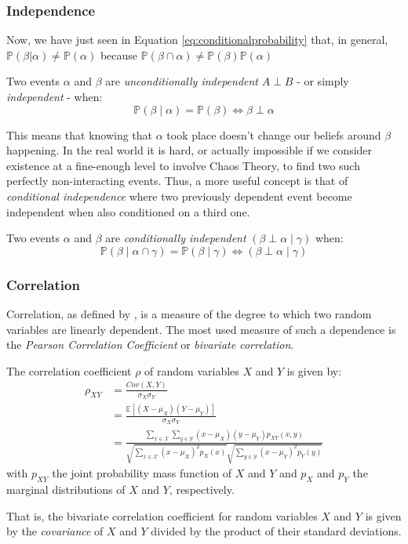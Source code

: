 \subsubsection{Independence}
Now, we have just seen in Equation \ref{eq:conditionalprobability} that, in general, $\mathbb{P}(\beta | \alpha) \neq \mathbb{P}(\alpha)$ because $\mathbb{P}(\beta \cap \alpha) \neq \mathbb{P}(\beta) \mathbb{P}(\alpha)$
\begin{definition}
Two events $\alpha$ and $\beta$ are \textit{unconditionally independent} $A \perp B$ - or simply \textit{independent} - when:
\begin{equation}
	\mathbb{P}(\beta \mid \alpha) = \mathbb{P}(\beta) \Leftrightarrow \beta \perp \alpha
\end{equation}
\end{definition}
This means that knowing that $\alpha$ took place doesn't change our beliefs around $\beta$ happening. 
In the real world it is hard, or actually impossible if we consider existence at a fine-enough level to involve Chaos Theory, to find two such perfectly non-interacting events.
Thus, a more useful concept is that of \textit{conditional independence} where two previously dependent event become independent when also conditioned on a third one.
\begin{definition}
Two events $\alpha$ and $\beta$ are \textit{conditionally independent} $(\beta \perp \alpha \mid \gamma)$ when:
	\begin{equation}
	\mathbb{P}(\beta \mid \alpha \cap \gamma ) = \mathbb{P}(\beta \mid \gamma) \Leftrightarrow (\beta \perp \alpha \mid \gamma)
\end{equation}
\end{definition}

\subsubsection{Correlation}
Correlation, as defined by \cite{Stolp2006}, is a measure of the degree to which two random variables are linearly dependent.
The most used measure of such a dependence is the \textit{Pearson Correlation Coefficient} or \textit{bivariate correlation}.
\begin{definition}
	The correlation coefficient $\rho$ of random variables $X$ and $Y$ is given by:
	\begin{align} \label{eq:correlation}
		\rho_{XY} &= \frac{Cov(X,Y)}{\sigma_X \sigma_Y} \\
		&= \frac{\mathbb{E}[ (X - \mu_X) (Y - \mu_Y) ]}{\sigma_X \sigma_Y} \\
		&= \frac{\sum_{x \in \mathcal{X}} \sum_{y \in \mathcal{Y}} (x - \mu_X) (y - \mu_Y) p_{XY}(x,y)}{ \sqrt{\sum_{x \in \mathcal{X}}  (x - \mu_X)^2 p_X(x)} \sqrt{\sum_{y \in \mathcal{Y}} (x - \mu_Y)^2 p_Y(y)} } 
	\end{align}
	with $p_{XY}$ the joint probability mass function of $X$ and $Y$ and $p_{X}$ and $p_{Y}$ the marginal distributions of $X$ and $Y$, respectively.
\end{definition}
That is, the bivariate correlation coefficient for random variables $X$ and $Y$ is given by the \textit{covariance} of $X$ and $Y$ divided by the product of their standard deviations.

